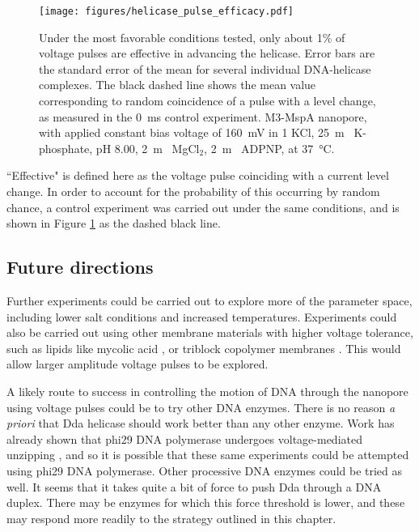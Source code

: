 \begin{figure}[h]
\begin{centering}
\texttt{[image: figures/helicase\_pulse\_efficacy.pdf]}
\caption[Quantifying efficacy of pulses]{Under the most favorable conditions tested, only about 1\% of voltage pulses are effective in advancing the helicase.  Error bars are the standard error of the mean for several individual DNA-helicase complexes.  The black dashed line shows the mean value corresponding to random coincidence of a pulse with a level change, as measured in the \SI{0}{\ms} control experiment.  M3-MspA nanopore, with applied constant bias voltage of \SI{160}{\mV} in \SI{1}{\Molar} KCl, \SI{25}{\m\Molar} K-phosphate, pH \num{8.00}, \SI{2}{\m\Molar} MgCl$_2$, \SI{2}{\m\Molar} ADPNP, at \SI{37}{\celsius}.}
\label{fig:helicase_pulse_efficacy}
\end{centering}
\end{figure}

``Effective" is defined here as the voltage pulse coinciding with a current level change.  In order to account for the probability of this occurring by random chance, a control experiment was carried out under the same conditions, and is shown in Figure \ref{fig:helicase_pulse_efficacy} as the dashed black line.

\subsection{Future directions}

Further experiments could be carried out to explore more of the parameter space, including lower salt conditions and increased temperatures.  Experiments could also be carried out using other membrane materials with higher voltage tolerance, such as lipids like mycolic acid \citep{Langford2011}, or triblock copolymer membranes \citep{Nardin2000a, Gonzalez-Perez2009}.  This would allow larger amplitude voltage pulses to be explored.

A likely route to success in controlling the motion of DNA through the nanopore using voltage pulses could be to try other DNA enzymes.  There is no reason \textit{a priori} that Dda helicase should work better than any other enzyme.  Work has already shown that phi29 DNA polymerase undergoes voltage-mediated unzipping \citep{Cherf2012}, and so it is possible that these same experiments could be attempted using phi29 DNA polymerase.  Other processive DNA enzymes could be tried as well.  It seems that it takes quite a bit of force to push Dda through a DNA duplex.  There may be enzymes for which this force threshold is lower, and these may respond more readily to the strategy outlined in this chapter.

